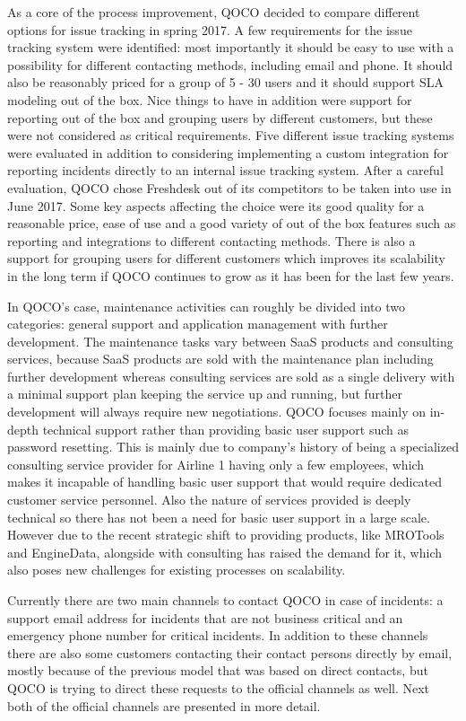 As a core of the process improvement, QOCO decided to compare different options for issue tracking in spring 2017. A few requirements for the issue tracking system were identified:
most importantly it should be easy to use with a possibility for different contacting methods, including email and phone. It should also be reasonably priced for a group of 5 - 30 users
and it should support SLA modeling out of the box. Nice things to have in addition were support for reporting out of the box and grouping users by different customers, but these
were not considered as critical requirements. Five different issue tracking systems were evaluated in addition to considering implementing a custom integration for reporting incidents
directly to an internal issue tracking system. After a careful evaluation, QOCO chose Freshdesk out of its competitors to be taken into use in June 2017. Some key aspects
affecting the choice were its good quality for a reasonable price, ease of use and a good variety of out of the box features such as reporting and integrations to different
contacting methods. There is also a support for grouping users for different customers which improves its scalability in the long term if QOCO continues to grow as it has been
for the last few years.

In QOCO's case, maintenance activities can roughly be divided into two categories: general support and application management with further development. The maintenance
tasks vary between SaaS products and consulting services, because SaaS products are sold with the maintenance plan including further development
whereas consulting services are sold as a single delivery with a minimal support plan keeping the service up and running, but further development will always require new negotiations.
QOCO focuses mainly on in-depth technical support rather than providing basic user support such as password resetting.
This is mainly due to company's history of being a specialized consulting service provider for Airline 1 having only a few employees, which makes it
incapable of handling basic user support that would require dedicated customer service personnel.
Also the nature of services provided is deeply technical so there has not been a need for basic user support in a large scale. However due to the recent
strategic shift to providing products, like MROTools and EngineData, alongside with consulting has raised the demand for it, which also poses new
challenges for existing processes on scalability.

Currently there are two main channels to contact QOCO in case of incidents: a support email address for incidents that are not business critical and an emergency
phone number for critical incidents. In addition to these channels there are also some customers contacting their contact persons directly by email, mostly because of
the previous model that was based on direct contacts, but QOCO is trying to direct these requests to the official channels as well. Next both of the official channels are presented
in more detail.

